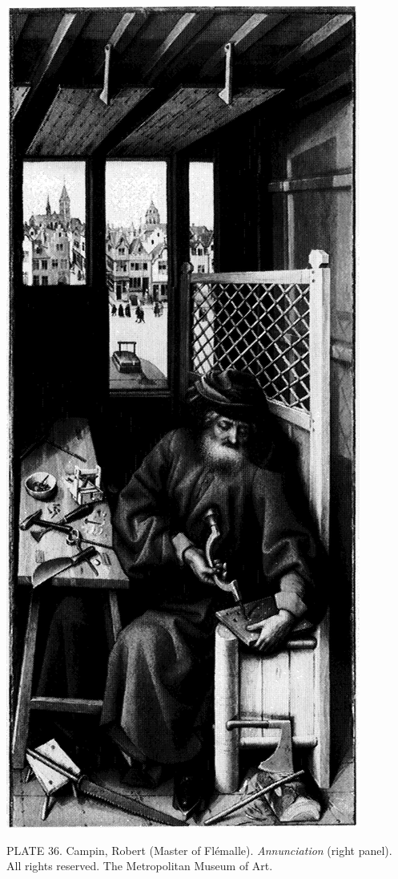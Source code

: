 \protect\hypertarget{20_ILLUSTRATIONS_FOLLOW_PAGE.xhtmlux5cux23id_31}{}{}\includegraphics{include/html/images/351_1.png}

PLATE 36. Campin, Robert (Master of Flémalle). \emph{Annunciation}
(right panel). All rights reserved. The Metropolitan Museum of Art.

